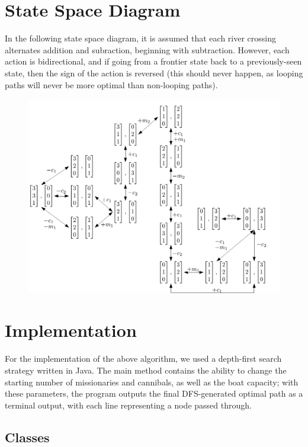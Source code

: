 \documentclass[11pt]{article}
\begin{document}
\section{State Space Diagram}
In the following state space diagram, it is assumed that each river crossing alternates addition and subraction, beginning with subtraction. However, each action is bidirectional, and if going from a frontier state back to a previously-seen state, then the sign of the action is reversed (this should never happen, as looping paths will never be more optimal than non-looping paths).
\begin{figure}[H] 
  \includegraphics[scale=0.5]{State-Space-Matrices.png}
\end{figure}

\section{Implementation}
For the implementation of the above algorithm, we used a depth-first search strategy written in Java. The main method contains the ability to change the starting number of missionaries and cannibals, as well as the boat capacity; with these parameters, the program outputs the final DFS-generated optimal path as a terminal output, with each line representing a node passed through. \vfill
\subsection{Classes}
\end{document}
